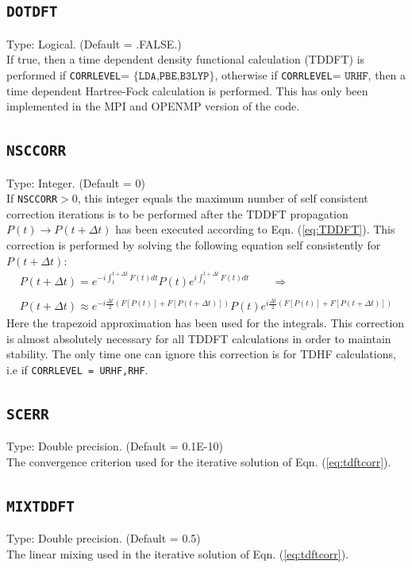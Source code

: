 \documentclass[a4paper,twoside,openany]{book}
\begin{document}
 \subsection{\texttt{DOTDFT}}
 Type: Logical. (Default = .FALSE.)\\
 If true, then a time dependent density functional calculation (TDDFT) is performed if \texttt{CORRLEVEL}= $\{\texttt{LDA,PBE,B3LYP}\}$, otherwise if \texttt{CORRLEVEL}= $\texttt{URHF}$, 
 then a time dependent Hartree-Fock calculation is performed. This has only been implemented in the MPI and OPENMP version of the code.


\subsection{\texttt{NSCCORR}} 
Type: Integer. (Default = 0)\\
If \texttt{NSCCORR}$>$0, this integer equals the maximum number of self consistent correction iterations is to be performed after the TDDFT propagation 
$P(t) \rightarrow P(t+\Delta t)$ has been executed according to Eqn. (\ref{eq:TDDFT}). This correction is performed by solving the following equation
self consistently for $P(t+\Delta t)$:
\begin{eqnarray}\label{eq:tdftcorr}
P(t+\Delta t) = e^{-i\int_{t}^{t+\Delta t}F(t)dt}P(t)e^{i\int_{t}^{t+\Delta t}F(t)dt} \qquad \Rightarrow \nonumber \\
\nonumber \\
P(t+\Delta t) \approx e^{-i\frac{\Delta t}{2}(F[P(t)]+F[P(t+\Delta t)])}P(t)e^{i\frac{\Delta t}{2}(F[P(t)]+F[P(t+\Delta t)])}
\end{eqnarray}
Here the trapezoid approximation has been used for the integrals. This correction is almost absolutely necessary for all TDDFT calculations in order to maintain stability. The only time one can ignore this correction is for TDHF calculations, i.e if \texttt{CORRLEVEL = URHF,RHF}.

\subsection{\texttt{SCERR}} 
Type: Double precision. (Default = 0.1E-10)\\
The convergence criterion used for the iterative solution of Eqn. (\ref{eq:tdftcorr}).
 \subsection{\texttt{MIXTDDFT}} 
Type: Double precision. (Default = 0.5)\\
The linear mixing used in the iterative solution of  Eqn. (\ref{eq:tdftcorr}).
\end{document}
